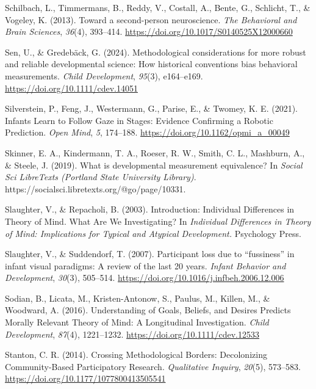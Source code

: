 \documentclass[
]{scrbook}
\newlength{\cslhangindent}
\newenvironment{CSLReferences}[2] %
 {\begin{list}{}{%
  \setlength{\itemindent}{0pt}
  \setlength{\leftmargin}{0pt}
  \setlength{\parsep}{0pt}
  \ifodd #1
   \setlength{\leftmargin}{\cslhangindent}
   \setlength{\itemindent}{-1\cslhangindent}
  \fi
  \setlength{\itemsep}{#2\baselineskip}}}
 {\end{list}}
\begin{document}
\begin{CSLReferences}{1}{0}
Schilbach, L., Timmermans, B., Reddy, V., Costall, A., Bente, G., Schlicht, T., \& Vogeley, K. (2013). Toward a second-person neuroscience. \emph{The Behavioral and Brain Sciences}, \emph{36}(4), 393--414. \url{https://doi.org/10.1017/S0140525X12000660}

Sen, U., \& Gredebäck, G. (2024). Methodological considerations for more robust and reliable developmental science: {How} historical conventions bias behavioral measurements. \emph{Child Development}, \emph{95}(3), e164--e169. \url{https://doi.org/10.1111/cdev.14051}

Silverstein, P., Feng, J., Westermann, G., Parise, E., \& Twomey, K. E. (2021). Infants {Learn} to {Follow Gaze} in {Stages}: {Evidence Confirming} a {Robotic Prediction}. \emph{Open Mind}, \emph{5}, 174--188. \url{https://doi.org/10.1162/opmi_a_00049}

Skinner, E. A., Kindermann, T. A., Roeser, R. W., Smith, C. L., Mashburn, A., \& Steele, J. (2019). What is developmental measurement equivalence? In \emph{Social Sci LibreTexts (Portland State University Library)}. https://socialsci.libretexts.org/@go/page/10331.

Slaughter, V., \& Repacholi, B. (2003). Introduction: {Individual Differences} in {Theory} of {Mind}. {What Are We Investigating}? In \emph{Individual {Differences} in {Theory} of {Mind}: {Implications} for {Typical} and {Atypical Development}.} Psychology Press.

Slaughter, V., \& Suddendorf, T. (2007). Participant loss due to {``fussiness''} in infant visual paradigms: {A} review of the last 20 years. \emph{Infant Behavior and Development}, \emph{30}(3), 505--514. \url{https://doi.org/10.1016/j.infbeh.2006.12.006}

Sodian, B., Licata, M., Kristen-Antonow, S., Paulus, M., Killen, M., \& Woodward, A. (2016). Understanding of {Goals}, {Beliefs}, and {Desires Predicts Morally Relevant Theory} of {Mind}: {A Longitudinal Investigation}. \emph{Child Development}, \emph{87}(4), 1221--1232. \url{https://doi.org/10.1111/cdev.12533}

Stanton, C. R. (2014). Crossing {Methodological Borders}: {Decolonizing Community-Based Participatory Research}. \emph{Qualitative Inquiry}, \emph{20}(5), 573--583. \url{https://doi.org/10.1177/1077800413505541}


\end{CSLReferences}
\end{document}
